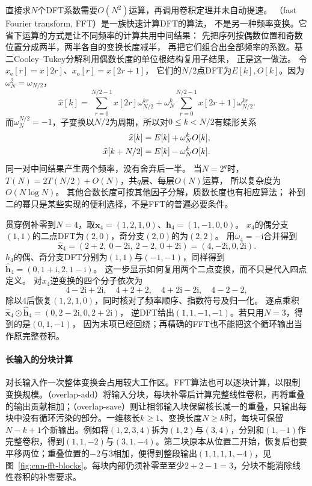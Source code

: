 直接求$N$个DFT系数需要$O(N^2)$运算，再调用卷积定理并未自动提速。
（fast Fourier transform, FFT）是一族快速计算DFT的算法，
不是另一种频率变换。它省下运算的方式是让不同频率的计算共用中间结果：
先把序列按偶数位置和奇数位置分成两半，两半各自的变换长度减半，
再把它们组合出全部频率的系数。基二Cooley--Tukey分解利用偶数长度的单位根结构复用子结果，
正是这一做法。
令$x_{\mathrm e}[r]=x[2r]$、$x_{\mathrm o}[r]=x[2r+1]$，
它们的$N/2$点DFT为$E[k],O[k]$。因为$\omega_N^2=\omega_{N/2}$，
\[
  \widehat x[k]
  =\sum_{r=0}^{N/2-1}x[2r]\omega_{N/2}^{kr}
   +\omega_N^k\sum_{r=0}^{N/2-1}x[2r+1]\omega_{N/2}^{kr}.
\]
而$\omega_N^{N/2}=-1$，子变换以$N/2$为周期，所以对$0\leq k<N/2$有蝶形关系
\begin{align}
  \widehat x[k]&=E[k]+\omega_N^kO[k],\notag\\
  \widehat x[k+N/2]&=E[k]-\omega_N^kO[k].
  \label{eq:signal-analysis-fft-butterfly}
\end{align}
\BookEquationAliases{\label{eq:cnn-fft-butterfly}}
同一对中间结果产生两个频率，没有舍弃后一半。
当$N=2^q$时，$T(N)=2T(N/2)+O(N)$，共$q$层、每层$O(N)$运算，
所以复杂度为$O(N\log N)$。
其他合数长度可按其他因子分解，质数长度也有相应算法；
补到二的幂只是某些实现的便利选择，不是FFT的普遍必要条件。

贯穿例补零到$N=4$，取$\bm x_4=(1,2,1,0)$、$\bm h_4=(1,-1,0,0)$。
$x_4$的偶分支$(1,1)$的二点DFT为$(2,0)$，奇分支$(2,0)$的为$(2,2)$。
用$\omega_4=-\mathrm i$合并得到
\[
  \widehat{\bm x}_4=(2+2,\ 0-2\mathrm i,\ 2-2,\ 0+2\mathrm i)
  =(4,-2\mathrm i,0,2\mathrm i).
\]
$h_4$的偶、奇分支DFT分别为$(1,1)$与$(-1,-1)$，同样得到
$\widehat{\bm h}_4=(0,1+\mathrm i,2,1-\mathrm i)$。
这一步显示如何复用两个二点变换，而不只是代入四点定义。
对$x_4$逆变换的四个分子依次为
\[
  4-2\mathrm i+2\mathrm i,\quad 4+2+2,\quad
  4+2\mathrm i-2\mathrm i,\quad 4-2-2,
\]
除以$4$后恢复$(1,2,1,0)$，同时核对了频率顺序、指数符号及归一化。
逐点乘积
$\widehat{\bm x}_4\odot\widehat{\bm h}_4=(0,2-2\mathrm i,0,2+2\mathrm i)$，
逆DFT给出$(1,1,-1,-1)$。若只用$N=3$，得到的是$(0,1,-1)$，
因为末项已经回绕；再精确的FFT也不能把这个循环输出当作原完整卷积。

\paragraph{长输入的分块计算}

对长输入作一次整体变换会占用较大工作区。FFT算法也可以逐块计算，以限制变换规模。（overlap-add）将输入分块，每块补零后计算完整线性卷积，再将重叠的输出贡献相加；（overlap-save）则让相邻输入块保留核长减一的重叠，只输出每块中没有循环污染的部分。一维核长$k\geq1$、变换长度$N\geq k$时，每块可保留$N-k+1$个新输出。例如将$(1,2,3,4)$拆为$(1,2)$与$(3,4)$，分别和$(1,-1)$作完整卷积，得到$(1,1,-2)$与$(3,1,-4)$。第二块原本从位置二开始，恢复后也要平移两位；重叠位置的$-2$与$3$相加，便得到整段输出$(1,1,1,1,-4)$，见图~\ref{fig:cnn-fft-blocks}。每块内部仍须补零至至少$2+2-1=3$，分块不能消除线性卷积的补零要求。

